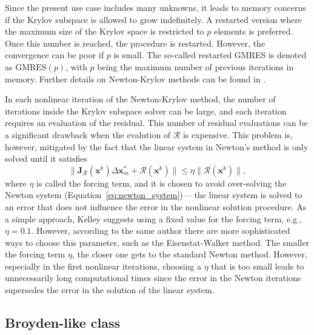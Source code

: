           Since the present use case includes many unknowns, it leads to memory concerns if the Krylov subspace is allowed to grow indefinitely.
          A restarted version where the maximum size of the Krylov space is restricted to \(p\) elements is preferred.
          Once this number is reached, the procedure is restarted.
          However, the convergence can be poor if \(p\) is small.
          The so-called restarted GMRES is denoted as \(\text{GMRES}(p)\), with \(p\) being the maximum number of previous iterations in memory.
          Further details on Newton-Krylov methods can be found in \cite{kelley_solving_2003}.

          In each nonlinear iteration of the Newton-Krylov method, the number of iterations inside the Krylov subspace solver can be large, and each iteration requires an evaluation of the residual.
          This number of residual evaluations can be a significant drawback when the evalution of \(\bm{\mathcal{R}}\) is expensive.
          This problem is, however, mitigated by the fact that the linear system in Newton's method is only solved until it satisfies
          \begin{equation}
            \|\bm{\mathbf{J}}_{\bm{\mathcal{R}}}(\mathbf{x}^k) \Delta \mathbf{x}^*_m+ \bm{\mathcal{R}}(\mathbf{x}^k)\| \leq \eta\|\bm{\mathcal{R}}(\mathbf{x}^k)\|,
          \end{equation}
          where \(\eta\) is called the forcing term, and it is chosen to avoid over-solving the Newton system (Equation~\eqref{eq:newton_system})--- the linear system is solved to an error that does not influence the error in the nonlinear solution procedure.
          As a simple approach, Kelley \citep{kelley_solving_2003} suggests using a fixed value for the forcing term, e.g., \(\eta=0.1\).
          However, according to the same author there are more sophisticated ways to choose this parameter, such as the Eisenstat-Walker method.
          The smaller the forcing term \(\eta\), the closer one gets to the standard Newton method.
          However, especially in the first nonlinear iterations, choosing a \(\eta\) that is too small leads to unnecessarily long computational times since the error in the Newton iterations supersedes the error in the solution of the linear system.

          \subsection{Broyden-like class} \label{sec:multisecant}

